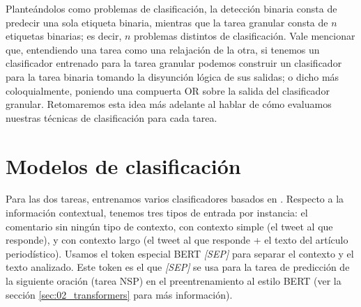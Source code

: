 Planteándolos como problemas de clasificación, la detección binaria consta de predecir una sola etiqueta binaria, mientras que la tarea granular consta de $n$ etiquetas binarias; es decir, $n$ problemas distintos de clasificación. Vale mencionar que, entendiendo una tarea como una relajación de la otra, si tenemos un clasificador entrenado para la tarea granular podemos construir un clasificador para la tarea binaria tomando la disyunción lógica de sus salidas; o dicho más coloquialmente, poniendo una compuerta OR sobre la salida del clasificador granular. Retomaremos esta idea más adelante al hablar de cómo evaluamos nuestras técnicas de clasificación para cada tarea.


\section{Modelos de clasificación}
\label{sec:contextualized_classifiers}





Para las dos tareas, entrenamos varios clasificadores basados en \beto{} \cite{canete2020spanish}. Respecto a la información contextual, tenemos tres tipos de entrada por instancia: el comentario sin ningún tipo de contexto, con contexto simple (el tweet al que responde), y con contexto largo (el tweet al que responde + el texto del artículo periodístico). Usamos el token especial BERT \emph {[SEP]} para separar el contexto y el texto analizado. Este token es el que \emph {[SEP]} se usa para la tarea de predicción de la siguiente oración (tarea NSP) en el preentrenamiento al estilo BERT (ver la sección \ref{sec:02_transformers} para más información).


